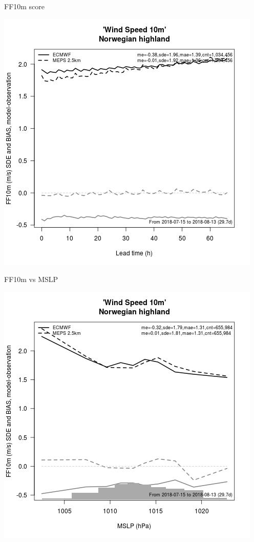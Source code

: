 \documentclass[letterpaper,10pt,twoside,twocolumn,openany]{book}
\begin{document}
{\begin{paperbox}{FF10m score}
  \centerline{\includegraphics[width=0.8\columnwidth]{ff10m_score_hl.jpg}}
\end{paperbox}

\begin{paperbox}{FF10m vs MSLP}
  \centerline{\includegraphics[width=0.8\columnwidth]{ff10m_mslp_hl.jpg}}
\end{paperbox}

}
\end{document}
